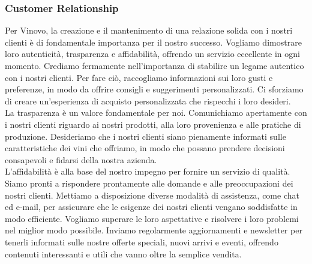 \documentclass[12pt, a4paper]{article}
\begin{document}
\subsubsection{Customer Relationship}
Per Vinovo, la creazione e il mantenimento di una relazione solida con i nostri clienti è di fondamentale importanza per il nostro successo. Vogliamo dimostrare loro autenticità, trasparenza e affidabilità, offrendo un servizio eccellente in ogni momento.
Crediamo fermamente nell'importanza di stabilire un legame autentico con i nostri clienti. Per fare ciò, raccogliamo informazioni sui loro gusti e preferenze, in modo da offrire consigli e suggerimenti personalizzati. Ci sforziamo di creare un'esperienza di acquisto personalizzata che rispecchi i loro desideri.\\
La trasparenza è un valore fondamentale per noi. Comunichiamo apertamente con i nostri clienti riguardo ai nostri prodotti, alla loro provenienza e alle pratiche di produzione. Desideriamo che i nostri clienti siano pienamente informati sulle caratteristiche dei vini che offriamo, in modo che possano prendere decisioni consapevoli e fidarsi della nostra azienda.\\
L'affidabilità è alla base del nostro impegno per fornire un servizio di qualità. Siamo pronti a rispondere prontamente alle domande e alle preoccupazioni dei nostri clienti. Mettiamo a disposizione diverse modalità di assistenza, come chat ed e-mail, per assicurare che le esigenze dei nostri clienti vengano soddisfatte in modo efficiente. Vogliamo superare le loro aspettative e risolvere i loro problemi nel miglior modo possibile. \qquad
Inviamo regolarmente aggiornamenti e newsletter per tenerli informati sulle nostre offerte speciali, nuovi arrivi e eventi, offrendo contenuti interessanti e utili che vanno oltre la semplice vendita.
\end{document}
